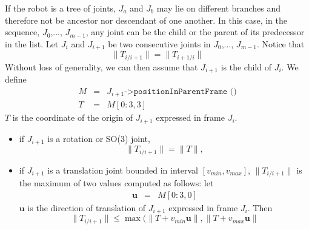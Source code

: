 \documentclass {article}
\begin{document}
If the robot is a tree of joints, $J_a$ and $J_b$ may lie on different branches
and therefore not be ancestor nor descendant of one another. In this case, in the sequence, $J_0$,..., $J_{m-1}$, any joint can be the child or the parent of its
predecessor in the list. Let $J_i$ and $J_{i+1}$ be two consecutive joints in $J_0$,..., $J_{m-1}$. Notice that
$$
\|T_{i/i+1}\| = \|T_{i+1/i}\|
$$
Without loss of generality, we can then assume that $J_{i+1}$ is the child of $J_i$. We define
\begin{eqnarray*}
M &=& J_{i+1}\texttt{->positionInParentFrame ()} \\
T &=& M [0:3, 3]
\end{eqnarray*}
$T$ is the coordinate of the origin of $J_{i+1}$ expressed in frame $J_{i}$.
\begin{itemize}
\item if $J_{i+1}$ is a rotation or SO(3) joint,
$$\|T_{i/i+1}\| = \|T\|,$$
\item if $J_{i+1}$ is a translation joint bounded in interval $[v_{min}, v_{max}]$,
$\|T_{i/i+1}\|$ is the maximum of two values computed as follows: let
\begin{eqnarray*}
\mathbf{u} &=& M [0:3, 0]
\end{eqnarray*}
$\mathbf{u}$ is the direction of translation of $J_{i+1}$ expressed in frame
$J_{i}$. Then
$$
\|T_{i/i+1}\| \leq \max (\|T+v_{min}\mathbf{u}\|, \|T+v_{max}\mathbf{u}\|
$$
\end{itemize}
\end{document}
